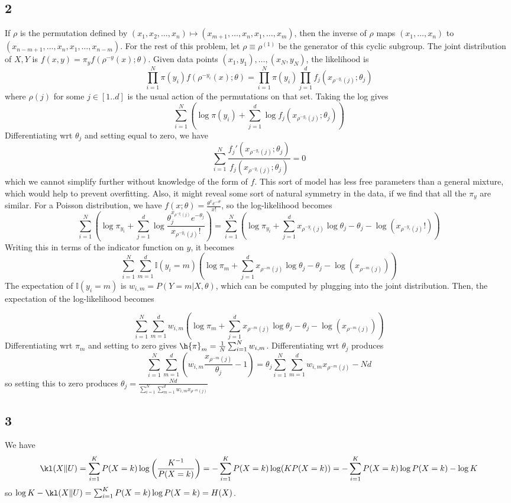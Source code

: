 \documentclass{article}
\begin{document}
\subsection*{2}
If $\rho$ is the permutation defined by $(x_1,x_2,\ldots,x_n)\mapsto(x_{m+1},\ldots,x_n,x_1,\ldots,x_m)$, then the inverse of $\rho$ maps $(x_1,\ldots,x_n)$ to $(x_{n-m+1},\ldots,x_n,x_1,\ldots,x_{n-m})$. For the rest of this problem, let $\rho\equiv\rho^{(1)}$ be the generator of this cyclic subgroup.
The joint distribution of $X,Y$ is $f(x,y)=\pi_yf(\rho^{-y}(x);\theta)$. Given data points $(x_1,y_1),\ldots,(x_N,y_N)$, the likelihood is
\[\prod_{i=1}^N\pi(y_i)f(\rho^{-y_i}(x);\theta)=\prod_{i=1}^N\pi(y_i)\prod_{j=1}^df_j(x_{\rho^{-y_i}(j)};\theta_j)\]
where $\rho(j)$ for some $j\in[1..d]$ is the usual action of the permutations on that set. Taking the log gives
\[\sum_{i=1}^N\left(\log\pi(y_i)+\sum_{j=1}^d\log f_j(x_{\rho^{-y_i}(j)};\theta_j)\right)\]
Differentiating wrt $\theta_j$ and setting equal to zero, we have
\[\sum_{i=1}^N\frac{f_j'(x_{\rho^{-y_i}(j)};\theta_j)}{f_j(x_{\rho^{-y_i}(j)};\theta_j)}=0\]
which we cannot simplify further without knowledge of the form of $f$.
This sort of model has less free parameters than a general mixture, which would help to prevent overfitting. Also, it might reveal some sort of natural symmetry in the data, if we find that all the $\pi_y$ are similar.
For a Poisson distribution, we have $f(x;\theta)=\frac{\theta^xe^{-\theta}}{x!}$, so the log-likelihood becomes
\[\sum_{i=1}^N\left(\log\pi_{y_i}+\sum_{j=1}^d\log \frac{\theta_j^{x_{\rho^{-y_i}(j)}}e^{-\theta_j}}{x_{\rho^{-y_i}(j)}!}\right)
=\sum_{i=1}^N\left(\log\pi_{y_i}+\sum_{j=1}^dx_{\rho^{-y_i}(j)}\log\theta_j-\theta_j-\log(x_{\rho^{-y_i}(j)}!)\right)\]
Writing this in terms of the indicator function on $y$, it becomes
\[\sum_{i=1}^N\sum_{m=1}^d\mathbb{I}(y_i=m)\left(\log\pi_m+\sum_{j=1}^dx_{\rho^{-m}(j)}\log\theta_j-\theta_j-\log(x_{\rho^{-m}(j)})\right)\]
The expectation of $\mathbb{I}(y_i=m)$ is $w_{i,m}=P(Y=m|X,\theta)$, which can be computed by plugging into the joint distribution. Then, the expectation of the log-likelihood becomes

\[\sum_{i=1}^N\sum_{m=1}^dw_{i,m}\left(\log\pi_m+\sum_{j=1}^dx_{\rho^{-m}(j)}\log\theta_j-\theta_j-\log(x_{\rho^{-m}(j)})\right)\]
Differentiating wrt $\pi_m$ and setting to zero gives $\h{\pi}_m=\frac{1}{N}\sum_{i=1}^Nw_{i,m}$. Differentiating wrt $\theta_j$ produces
\[\sum_{i=1}^N\sum_{m=1}^d\left(w_{i,m}\frac{x_{\rho^{-m}(j)}}{\theta_j}-1\right)=\theta_j\sum_{i=1}^N\sum_{m=1}^dw_{i,m}x_{\rho^{-m}(j)}-Nd\]
so setting this to zero produces $\theta_j=\frac{Nd}{\sum_{i=1}^N\sum_{m=1}^dw_{i,m}x_{\rho^{-m}(j)}}$
\subsection*{3}
We have 
\[\kl(X\|U)=\sum_{i=1}^KP(X=k)\log\left(\frac{K^{-1}}{P(X=k)}\right)=-\sum_{i=1}^KP(X=k)\log(KP(X=k))=-\sum_{i=1}^KP(X=k)\log P(X=k)-\log K\]
so $\log K-\kl(X\|U)=\sum_{i=1}^KP(X=k)\log P(X=k)=H(X)$.
\end{document}
